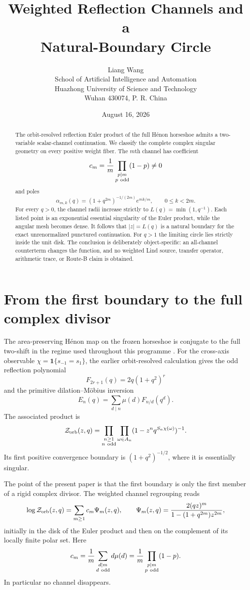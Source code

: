 \documentclass[11pt]{article}
\title{Weighted Reflection Channels and a\\Natural-Boundary Circle}
\author{Liang Wang\\\small School of Artificial Intelligence and Automation\\\small Huazhong University of Science and Technology\\\small Wuhan 430074, P. R. China}
\date{August 16, 2026}
\newcommand{\Zorb}{\mathcal Z_{\rm orb}}
\begin{document}
\maketitle

\begin{abstract}
The orbit-resolved reflection Euler product of the full H\'enon horseshoe
admits a two-variable scalar-channel continuation.  We classify the complete
complex singular geometry on every positive weight fiber.  The $m$th channel
has coefficient
\[
 c_m=\frac1m\prod_{\substack{p\mid m\\p\ {\rm odd}}}(1-p)\ne0
\]
and poles
\[
 \alpha_{m,k}(q)=(1+q^{2m})^{-1/(2m)}e^{\pi i k/m},
 \qquad 0\le k<2m.
\]
For every $q>0$, the channel radii increase strictly to
$L(q)=\min(1,q^{-1})$.  Each listed point is an exponential essential
singularity of the Euler product, while the angular mesh becomes dense.
It follows that $|z|=L(q)$ is a natural boundary for the exact
unrenormalized punctured continuation.  For $q>1$ the limiting circle lies
strictly inside the unit disk.  The conclusion is deliberately
object-specific: an all-channel counterterm changes the function, and no
weighted Lind source, transfer operator, arithmetic trace, or Route-B claim
is obtained.
\end{abstract}

\section{From the first boundary to the full complex divisor}

The area-preserving H\'enon map on the frozen horseshoe is conjugate to the
full two-shift in the regime used throughout this programme
\cite{DevaneyNitecki1979}.  For the cross-axis observable
\(\chi=\mathbf 1\{s_{-1}=s_1\}\), the earlier orbit-resolved calculation
gives the odd reflection polynomial
\[
 F_{2r+1}(q)=2q(1+q^2)^r
\]
and the primitive dilation--M\"obius inversion
\[
 E_n(q)=\sum_{d\mid n}\mu(d)F_{n/d}(q^d).
\]
The associated product is
\begin{equation}\label{eq:product}
 \Zorb(z,q)=
 \prod_{\substack{n\ge1\\n\ {\rm odd}}}
 \prod_{\omega\in A_n}
 (1-z^nq^{S_n\chi(\omega)})^{-1}.
\end{equation}
Its first positive convergence boundary is
\((1+q^2)^{-1/2}\), where it is essentially singular.

The point of the present paper is that the first boundary is only the first
member of a rigid complex divisor.  The weighted channel regrouping reads
\begin{equation}\label{eq:channels}
 \log\Zorb(z,q)=\sum_{m\ge1}c_m\Psi_m(z,q),
 \qquad
 \Psi_m(z,q)=
 \frac{2(qz)^m}{1-(1+q^{2m})z^{2m}},
\end{equation}
initially in the disk of the Euler product and then on the complement of its
locally finite polar set.  Here
\begin{equation}\label{eq:cm}
 c_m=\frac1m\sum_{\substack{d\mid m\\d\ {\rm odd}}}d\mu(d)
 =\frac1m\prod_{\substack{p\mid m\\p\ {\rm odd}}}(1-p).
\end{equation}
In particular no channel disappears.
\end{document}
